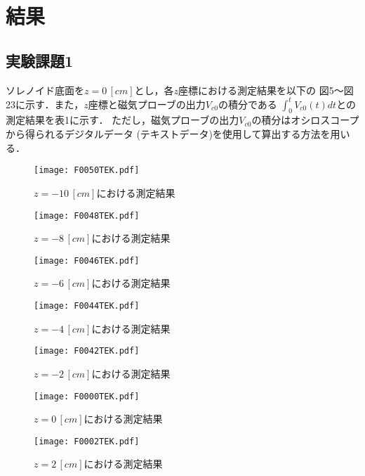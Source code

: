 
\section{結果}

\subsection{実験課題1}
ソレノイド底面を$z=0\,[\si{cm}]$とし，各$z$座標における測定結果を以下の
図5～図23に示す．また，$z$座標と磁気プローブの出力$V_{c0}$の積分である
$\int_{0}^{t}V_{c0}(t)dt$との測定結果を表1に示す．
ただし，磁気プローブの出力$V_{c0}$の積分はオシロスコープから得られるデジタルデータ
(テキストデータ)を使用して算出する方法を用いる．

\begin{figure}[H]
    \centering
    \texttt{[image: F0050TEK.pdf]}
    \caption{$z=-10\,[cm]$における測定結果}
\end{figure}

\begin{figure}[H]
    \centering
    \texttt{[image: F0048TEK.pdf]}
    \caption{$z=-8\,[cm]$における測定結果}
\end{figure}

\begin{figure}[H]
    \centering
    \texttt{[image: F0046TEK.pdf]}
    \caption{$z=-6\,[cm]$における測定結果}
\end{figure}

\begin{figure}[H]
    \centering
    \texttt{[image: F0044TEK.pdf]}
    \caption{$z=-4\,[cm]$における測定結果}
\end{figure}

\begin{figure}[H]
    \centering
    \texttt{[image: F0042TEK.pdf]}
    \caption{$z=-2\,[cm]$における測定結果}
\end{figure}

\begin{figure}[H]
    \centering
    \texttt{[image: F0000TEK.pdf]}
    \caption{$z=0\,[cm]$における測定結果}
\end{figure}

\begin{figure}[H]
    \centering
    \texttt{[image: F0002TEK.pdf]}
    \caption{$z=2\,[cm]$における測定結果}
\end{figure}

